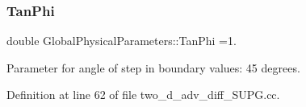 \mbox{\label{namespaceGlobalPhysicalParameters_af9a5a947d725f1f088db6a6423f2f3ef}} 
\subsubsection{\texorpdfstring{Tan\+Phi}{TanPhi}}
{\footnotesize\ttfamily double Global\+Physical\+Parameters\+::\+Tan\+Phi =1.}



Parameter for angle of step in boundary values\+: 45 degrees. 



Definition at line 62 of file two\+\_\+d\+\_\+adv\+\_\+diff\+\_\+\+S\+U\+P\+G.\+cc.

